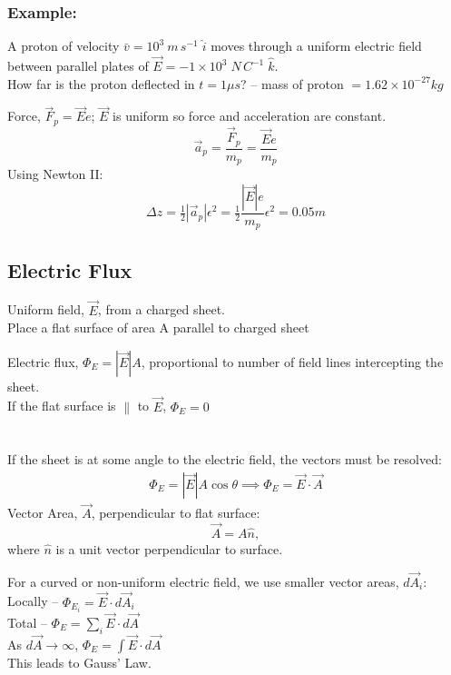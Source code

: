 \documentclass[a4paper, 11pt, fleqn, normalem]{report}
\begin{document}
\subsection{Example:}
A proton of velocity $\bar{v} = 10^{3} \: m \, s^{-1} \; \hat{i}$ moves through a uniform electric field between parallel plates of $\vec{E} = -1 \times 10^{3} \; N \, C^{-1} \; \hat{k}$. \\
How far is the proton deflected in $t = 1 \mu s$? -- mass of proton $= 1.62 \times 10^{-27} kg$

Force, $\vec{F}_{p} = \vec{E}e$; $\vec{E}$ is uniform so force and acceleration are constant.
\begin{equation*}
    \vec{a}_{p} = \frac{\vec{F}_{p}}{m_{p}} = \frac{\vec{E}e}{m_{p}}
\end{equation*}
Using Newton \RN{2}:
\begin{equation*}
    \Delta z = \tfrac{1}{2}|\vec{a}_{p}|\epsilon^{2} = \tfrac{1}{2} \frac{|\vec{E}|e}{m_{p}}\epsilon^{2} = 0.05m
\end{equation*}

\section{Electric Flux}
Uniform field, $\vec{E}$, from a charged sheet. \\
Place a flat surface of area A parallel to charged sheet

Electric flux, $\Phi_{E} = |\vec{E}|A$, proportional to number of field lines intercepting the sheet. \\
If the flat surface is $\parallel$ to $\vec{E}$, $\Phi_{E} = 0$

\chapter{}
If the sheet is at some angle to the electric field, the vectors must be resolved:
\begin{gather*}
    \Phi_{E} = |\vec{E}|A\cos\theta \implies
    \Phi_{E} = \vec{E} \cdot \vec{A}
\end{gather*}
Vector Area, $\vec{A}$, perpendicular to flat surface:
\begin{equation*}
    \vec{A} = A\hat{n},
\end{equation*}
where $\hat{n}$ is a unit vector perpendicular to surface.

For a curved or non-uniform electric field, we use smaller vector areas, $d\vec{A}_{i}$: \\
Locally -- $\Phi_{E_{i}} = \vec{E} \cdot d\vec{A}_{i}$ \\
Total -- $\Phi_{E} = \sum_{i} \vec{E} \cdot d\vec{A}$ \\
As $d\vec{A} \to \infty$, $\Phi_{E} = \int \vec{E} \cdot d\vec{A}$ \\
This leads to Gauss' Law.
\end{document}
